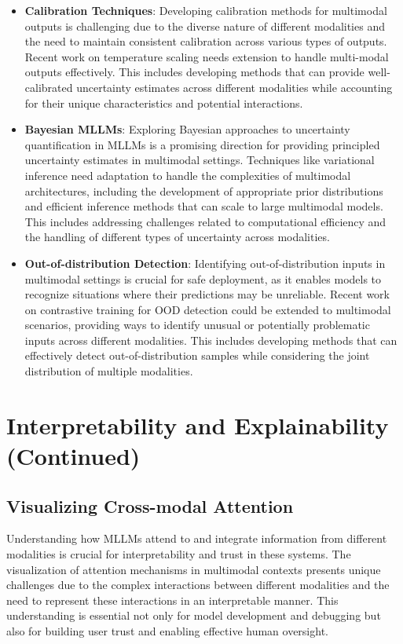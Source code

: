\begin{itemize}
    \item \textbf{Calibration Techniques}: Developing calibration methods for multimodal outputs is challenging due to the diverse nature of different modalities and the need to maintain consistent calibration across various types of outputs. Recent work on temperature scaling \citep{guo2017calibration} needs extension to handle multi-modal outputs effectively. This includes developing methods that can provide well-calibrated uncertainty estimates across different modalities while accounting for their unique characteristics and potential interactions.
    
    \item \textbf{Bayesian MLLMs}: Exploring Bayesian approaches to uncertainty quantification in MLLMs is a promising direction for providing principled uncertainty estimates in multimodal settings. Techniques like variational inference \citep{blei2017variational} need adaptation to handle the complexities of multimodal architectures, including the development of appropriate prior distributions and efficient inference methods that can scale to large multimodal models. This includes addressing challenges related to computational efficiency and the handling of different types of uncertainty across modalities.
    
    \item \textbf{Out-of-distribution Detection}: Identifying out-of-distribution inputs in multimodal settings is crucial for safe deployment, as it enables models to recognize situations where their predictions may be unreliable. Recent work on contrastive training for OOD detection \citep{tack2020csi} could be extended to multimodal scenarios, providing ways to identify unusual or potentially problematic inputs across different modalities. This includes developing methods that can effectively detect out-of-distribution samples while considering the joint distribution of multiple modalities.
\end{itemize}

\section{Interpretability and Explainability (Continued)}

\subsection{Visualizing Cross-modal Attention}
Understanding how MLLMs attend to and integrate information from different modalities is crucial for interpretability and trust in these systems. The visualization of attention mechanisms in multimodal contexts presents unique challenges due to the complex interactions between different modalities and the need to represent these interactions in an interpretable manner. This understanding is essential not only for model development and debugging but also for building user trust and enabling effective human oversight.

